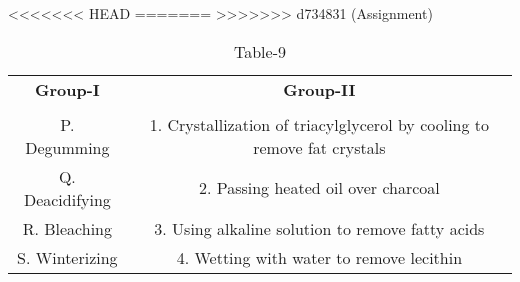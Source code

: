 \begin{table}[htbp]
  \centering
  \caption{Table-9}
<<<<<<< HEAD
  \label{tab:tables/table9.tex}
=======
  \label{table9}
>>>>>>> d734831 (Assignment)
  \begin{tabular}{cc}
  \textbf{Group-I} & \textbf{Group-II} \\ \\
    P. Degumming & 1. Crystallization of triacylglycerol by cooling to remove fat crystals \\
    Q. Deacidifying & 2. Passing heated oil over charcoal \\
    R. Bleaching & 3. Using alkaline solution to remove fatty acids \\
    S. Winterizing & 4. Wetting with water to remove lecithin \\
  \end{tabular}
\end{table}